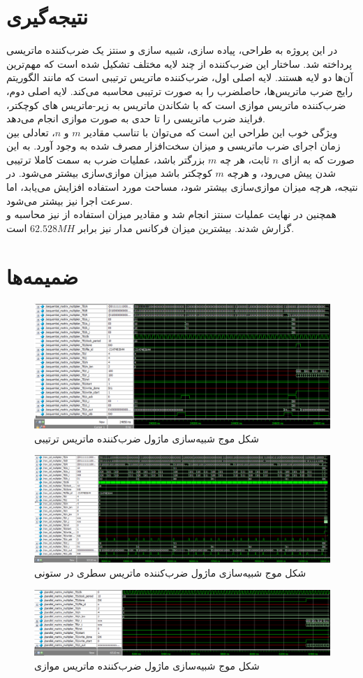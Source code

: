 \documentclass[conference]{IEEEtran-ModifiedForMVIP}
\begin{document}
\section{نتیجه‌گیری}
در این پروژه به طراحی، پیاده سازی، شبیه سازی و سنتز یک ضرب‌کننده ماتریسی پرداخته شد. 
ساختار این ضرب‌کننده از چند لایه مختلف تشکیل شده است که مهم‌ترین آن‌ها دو لایه هستند. لایه اصلی اول،  ضرب‌کننده ماتریس ترتیبی
است که مانند الگوریتم رایج ضرب ماتریس‌‌ها، حاصلضرب را به صورت ترتیبی محاسبه می‌کند. 
لایه اصلی دوم، ضرب‌کننده ماتریس موازی است که با شکاندن ماتریس به زیر-ماتریس ‌‌های کوچکتر، فرایند ضرب ماتریسی را تا 
حدی به صورت موازی انجام می‌دهد.\\
ویژگی خوب این طراحی این است که می‌توان با تناسب مقادیر
$m$
و
$n$،
تعادلی بین زمان اجرای ضرب ماتریسی و میزان سخت‌افزار مصرف شده به وجود آورد. به این صورت که به ازای 
$n$
ثابت، هر چه
$m$
بزرگتر باشد، عملیات ضرب به سمت کاملا ترتیبی شدن پیش می‌رود، و هرچه
$m$
کوچکتر باشد میزان موازی‌سازی بیشتر می‌شود. در نتیجه،‌ هرچه میزان موازی‌سازی بیشتر شود، مساحت مورد استفاده افزایش می‌یابد، اما سرعت اجرا نیز بیشتر می‌شود.\\
 همچنین در نهایت عملیات سنتز انجام شد و مقادیر میزان استفاده از 
 نیز محاسبه و گزارش شدند. بیشترین میزان فرکانس مدار نیز برابر 
 $62.528 MH$
 است.

\newpage
\onecolumn

\section{ضمیمه‌ها}

\begin{figure}[ht]
\centering
\includegraphics[width=.85\linewidth]{Images/SequentialWF.png}
\caption{
\centering
شکل موج شبیه‌سازی ماژول ضرب‌کننده ماتریس ترتیبی
}
\end{figure}

\begin{figure}[ht]
\centering
\includegraphics[width=.85\linewidth]{Images/RowColWF.png}
\caption{
\centering
شکل موج شبیه‌سازی ماژول ضرب‌کننده ماتریس سطری در ستونی
}
\end{figure}

\begin{figure}[ht]
\centering
\includegraphics[width=.85\linewidth]{Images/ParallelWF.png}
\caption{
\centering
شکل موج شبیه‌سازی ماژول ضرب‌کننده ماتریس موازی
}
\end{figure}
\end{document}
